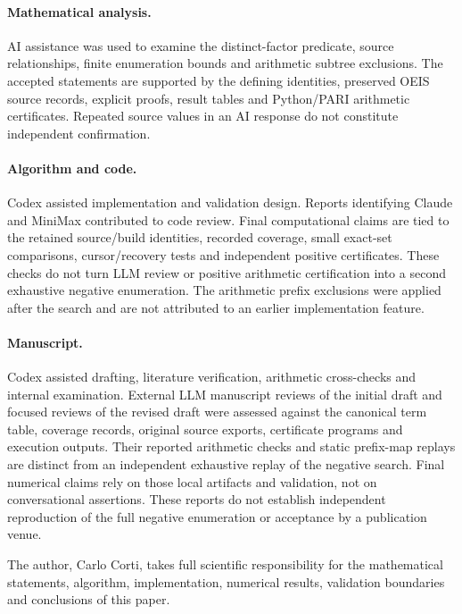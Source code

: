 \documentclass[11pt]{article}
\theoremstyle{remark}
\begin{document}
\paragraph{Mathematical analysis.}
AI assistance was used to examine the distinct-factor predicate, source
relationships, finite enumeration bounds and arithmetic subtree exclusions.
The accepted statements are supported by the defining identities, preserved
OEIS source records, explicit proofs, result tables and Python/PARI arithmetic
certificates. Repeated source values in an AI response do not constitute
independent confirmation.

\paragraph{Algorithm and code.}
Codex assisted implementation and validation design. Reports identifying
Claude and MiniMax contributed to code review. Final computational claims
are tied to the retained source/build identities, recorded coverage, small
exact-set comparisons, cursor/recovery tests and independent positive
certificates. These checks do not turn LLM review or positive arithmetic
certification into a second exhaustive negative enumeration. The arithmetic
prefix exclusions were applied after the search and are not attributed to
an earlier implementation feature.

\paragraph{Manuscript.}
Codex assisted drafting, literature verification, arithmetic cross-checks and
internal examination. External LLM manuscript reviews of the initial draft
and focused reviews of the revised draft were assessed against the canonical
term table, coverage records, original
source exports, certificate programs and execution outputs. Their reported
arithmetic checks and static prefix-map replays are distinct from an
independent exhaustive replay of the negative search. Final numerical
claims rely on those local artifacts and validation, not on conversational
assertions. These reports do not establish independent reproduction of the full
negative enumeration or acceptance by a publication venue.

The author, Carlo Corti, takes full scientific responsibility for the
mathematical statements, algorithm, implementation, numerical results,
validation boundaries and conclusions of this paper.
\end{document}
